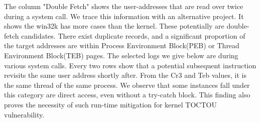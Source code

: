 %
%
%



The column "Double Fetch" shows the user-addresses that are read over twice during a system call. We trace this information with an alternative project. It shows the win32k has more cases than the kernel. These potentially are double-fetch candidates. There exist duplicate records, and a significant proportion of the target addresses are within Process Environment Block(PEB) or Thread Environment Block(TEB) pages.  The selected logs we give below are during various system calls.  Every two rows show that a potential subsequent instruction revisits the same user address shortly after. From the Cr3 and Teb values, it is the same thread of the same process. We observe that some instances fall under this category are direct access, even without a try-catch block. This finding also proves the necessity of such run-time mitigation for kernel TOCTOU vulnerability.





